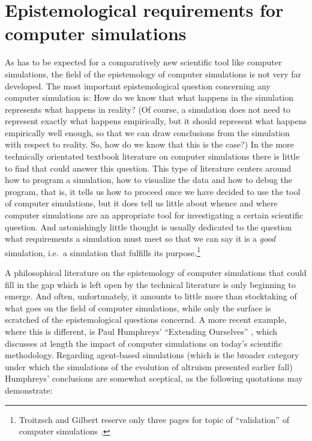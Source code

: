 \section{Epistemological requirements for computer simulations}
\label{epistemologicalRequirements}
As has to be expected for a comparatively new scientific tool like computer
simulations, the field of the epistemology of computer simulations is not very
far developed. The most important epistemological question concerning any
computer simulation is: How do we know that what happens in the simulation
represents what happens in reality? (Of course, a simulation does not need to
represent exactly what happens empirically, but it should represent what
happens empirically well enough, so that we can draw conclusions from the
simulation with respect to reality. So, how do we know that this is the case?)
In the more technically orientated textbook literature on computer simulations
\cite[]{troitzsch:2005} there is little to find that could
answer this question. This type of literature centers around how to program a
simulation, how to visualize the data and how to debug the program, that is,
it tells us how to proceed once we have decided to use the tool of computer
simulations, but it does tell us little about whence and where computer
simulations are an appropriate tool for investigating a certain scientific
question. And astonishingly little thought is usually dedicated to the
question what requirements a simulation must meet so that we can say it is a
{\em good} simulation, i.e.\ a simulation that fulfills its
purpose.\footnote{Troitzsch and Gilbert reserve only three pages for topic of
``validation'' of computer simulations \cite[p. 23-25]{troitzsch:2005}.}

A philosophical literature on the epistemology of computer simulations that
could fill in the gap which is left open by the technical literature is only
beginning to emerge. And often, unfortunately, it amounts to little more than 
stocktaking of what goes on the field of computer simulations, while only the
surface is scratched of the epistemological questions
\cite[]{hegselmann:1996} concernd. A more recent example, where this is
different, is Paul Humphreys' ``Extending Ourselves'' \cite[]{humphreys:2004},
which discusses at length the impact of computer simulations on today's
scientific methodology. Regarding agent-based simulations (which is the broader
category under which the simulations of the evolution of altruism presented
earlier fall) Humphreys' conclusions are somewhat sceptical, as the following
quotations may demonstrate:

